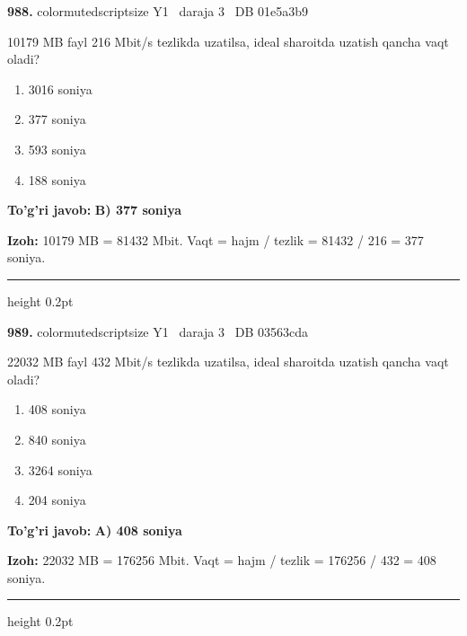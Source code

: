 \documentclass[10pt,a4paper,oneside]{article}
\begin{document}
\noindent\textbf{\color{ink}988.}  {color{muted}scriptsize Y1 \textbullet\ daraja 3 \textbullet\ DB 01e5a3b9}
\par
10179 MB fayl 216 Mbit/s tezlikda uzatilsa, ideal sharoitda uzatish qancha vaqt oladi?
\begin{enumerate}[label=\Alph*),leftmargin=9mm]
\item 3016 soniya
\item 377 soniya
\item 593 soniya
\item 188 soniya
\end{enumerate}
\begin{tcolorbox}[enhanced,breakable,colback=teal!4,colframe=teal!50!black,boxrule=0.5pt,arc=1.1mm,left=3mm,right=3mm,top=1.7mm,bottom=1.7mm,before skip=2mm,after skip=2mm]
\textbf{\color{teal}To'g'ri javob:} \textbf{B) 377 soniya}
\par\smallskip
\textbf{Izoh:} 10179 MB = 81432 Mbit. Vaqt = hajm / tezlik = 81432 / 216 = 377 soniya.
\end{tcolorbox}
\vspace{2mm}\hrule height 0.2pt \vspace{3mm}

\noindent\textbf{\color{ink}989.}  {color{muted}scriptsize Y1 \textbullet\ daraja 3 \textbullet\ DB 03563cda}
\par
22032 MB fayl 432 Mbit/s tezlikda uzatilsa, ideal sharoitda uzatish qancha vaqt oladi?
\begin{enumerate}[label=\Alph*),leftmargin=9mm]
\item 408 soniya
\item 840 soniya
\item 3264 soniya
\item 204 soniya
\end{enumerate}
\begin{tcolorbox}[enhanced,breakable,colback=teal!4,colframe=teal!50!black,boxrule=0.5pt,arc=1.1mm,left=3mm,right=3mm,top=1.7mm,bottom=1.7mm,before skip=2mm,after skip=2mm]
\textbf{\color{teal}To'g'ri javob:} \textbf{A) 408 soniya}
\par\smallskip
\textbf{Izoh:} 22032 MB = 176256 Mbit. Vaqt = hajm / tezlik = 176256 / 432 = 408 soniya.
\end{tcolorbox}
\vspace{2mm}\hrule height 0.2pt \vspace{3mm}
\end{document}
